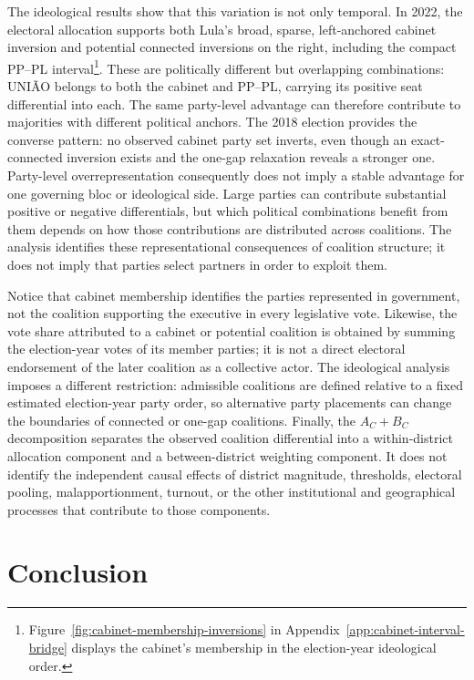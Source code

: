 \documentclass[11pt]{article}
\begin{document}
The ideological results show that this variation is not only temporal. In 2022,
the electoral allocation supports both Lula's broad, sparse, left-anchored
cabinet inversion and potential connected inversions on the right, including the
compact PP--PL interval\footnote{
  Figure~\ref{fig:cabinet-membership-inversions} in
  Appendix~\ref{app:cabinet-interval-bridge} displays the cabinet's membership
  in the election-year ideological order.}. These are politically different but
overlapping combinations: UNIÃO belongs to both the cabinet and PP--PL, carrying
its positive seat differential into each. The same party-level advantage can
therefore contribute to majorities with different political anchors. The 2018
election provides the converse pattern: no observed cabinet party set inverts,
even though an exact-connected inversion exists and the one-gap relaxation
reveals a stronger one. Party-level overrepresentation consequently does not
imply a stable advantage for one governing bloc or ideological side. Large
parties can contribute substantial positive or negative differentials, but which
political combinations benefit from them depends on how those contributions are
distributed across coalitions. The analysis identifies these representational
consequences of coalition structure; it does not imply that parties select
partners in order to exploit them.

Notice that cabinet membership identifies
the parties represented in government, not the coalition supporting the
executive in every legislative vote. Likewise, the vote share attributed to
a cabinet or potential coalition is obtained by summing the election-year
votes of its member parties; it is not a direct electoral endorsement of the
later coalition as a collective actor. The ideological analysis imposes a
different restriction: admissible coalitions are defined relative to a fixed
estimated election-year party order, so alternative party placements can
change the boundaries of connected or one-gap coalitions. Finally, the
\(A_C+B_C\) decomposition separates the observed coalition differential
into a within-district allocation component and a between-district weighting
component. It does not identify the independent causal effects of district
magnitude, thresholds, electoral pooling, malapportionment, turnout, or the
other institutional and geographical processes that contribute to those
components.





\section{Conclusion}
\end{document}
